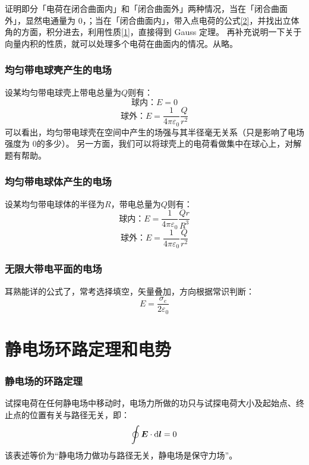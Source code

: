 \documentclass[UTF8,AutoFakeBold,b5paper]{ctexbook}
\begin{document}
证明即分「电荷在闭合曲面内」和「闭合曲面外」两种情况，当在「闭合曲面外」，显然电通量为 $0$，；当在「闭合曲面内」，带入点电荷的公式\ref{2}，并找出立体角的方面，积分进去，利用性质\ref{1}，直接得到 Gauss 定理。
再补充说明一下关于向量内积的性质，就可以处理多个电荷在曲面内的情况。从略。
\subsubsection{均匀带电球壳产生的电场}
设某均匀带电球壳上带电总量为$Q$则有：
\begin{equation}
	\text{球内：} E = 0
\end{equation}
\begin{equation}
	\text{球外：} E = \dfrac{1}{4\pi \varepsilon_{0}}\dfrac{Q}{r^{2}}
\end{equation}
\textcolor[rgb]{0.56,0.28,0.16}{可以看出，均匀带电球壳在空间中产生的场强与其半径毫无关系（只是影响了电场强度为 $0$的多少）。
另一方面，我们可以将球壳上的电荷看做集中在球心上，对解题有帮助。}
\subsubsection{均匀带电球体产生的电场}
设某均匀带电球体的半径为$R$，带电总量为$Q$则有：
\begin{equation}
	\text{球内：} E = \dfrac{1}{4\pi \varepsilon_{0}}\dfrac{Qr}{R^{3}}
\end{equation}
\begin{equation}
	\text{球外：} E = \dfrac{1}{4\pi \varepsilon_{0}}\dfrac{Q}{r^{2}}
\end{equation}
\subsubsection{无限大带电平面的电场}
耳熟能详的公式了，常考选择填空，矢量叠加，方向根据常识判断：
\begin{equation}
	E = \dfrac{\sigma_{e}}{2\varepsilon_{0}}
\end{equation}
\section{静电场环路定理和电势}
\subsubsection{静电场的环路定理}
试探电荷在任何静电场中移动时，电场力所做的功只与试探电荷大小及起始点、终止点的位置有关与路径无关，即：
\begin{equation}
	\oint \bm{E} \cdot \ce{d}\bm{l} = 0
\end{equation}
该表述等价为\textcolor[rgb]{0.56,0.28,0.16}{“静电场力做功与路径无关，静电场是保守力场”}。
\end{document}
